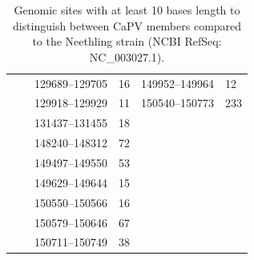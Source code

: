 \begin{table}[ht]
\begin{tabular}{ll|ll|ll}
													 &                                               & 129689--129705                               & 16                                         & 149952--149964                               & 12                                        \\
													 &                                               & 129918--129929                               & 11                                         & 150540--150773                               & 233                                       \\
													 &                                               & 131437--131455                               & 18                                         &                                              &                                           \\
													 &                                               & 148240--148312                               & 72                                         &                                              &                                           \\
													 &                                               & 149497--149550                               & 53                                         &                                              &                                           \\
													 &                                               & 149629--149644                               & 15                                         &                                              &                                           \\
													 &                                               & 150550--150566                               & 16                                         &                                              &                                           \\
													 &                                               & 150579--150646                               & 67                                         &                                              &                                           \\
													 &                                               & 150711--150749                               & 38                                         &                                              &                                           \\ \hline
	\end{tabular}
	\caption[Genomic sites to distinguish between CaPV members]{Genomic sites with at least 10 bases length to distinguish between CaPV members compared to the Neethling strain (NCBI RefSeq: NC\_003027.1).}
\label{tab:apx-lsdv-diffs}
\end{table}


